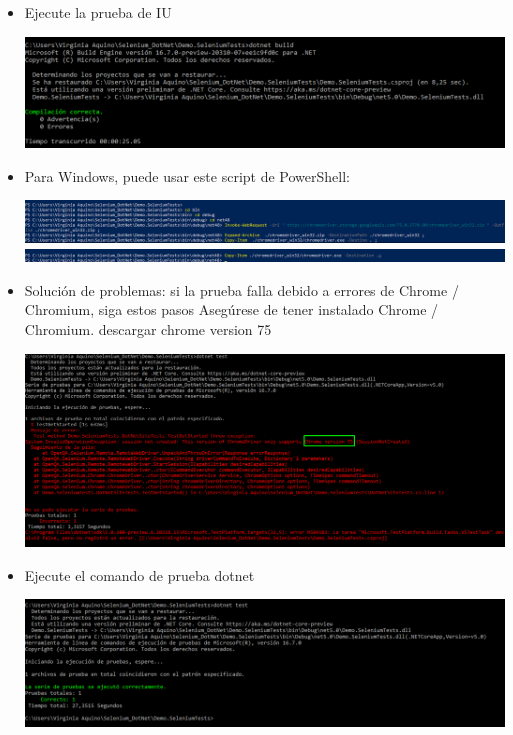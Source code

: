 \begin{itemize}
\begin{center}
\end{center}
\item Ejecute la prueba de IU
\begin{center}
\includegraphics[width=\columnwidth]{images/4}\newline
\end{center}
\item Para Windows, puede usar este script de PowerShell:
\begin{center}
\includegraphics[width=\columnwidth]{images/5}\newline
\includegraphics[width=\columnwidth]{images/6}\newline
\end{center}
\item Solución de problemas: si la prueba falla debido a errores de Chrome / Chromium, siga estos pasos
Asegúrese de tener instalado Chrome / Chromium. descargar chrome version 75
\begin{center}
\includegraphics[width=\columnwidth]{images/error}\newline
\end{center}
\item Ejecute el comando de prueba dotnet
\begin{center}
\includegraphics[width=\columnwidth]{images/final}\newline
\end{center}
\end{itemize}
